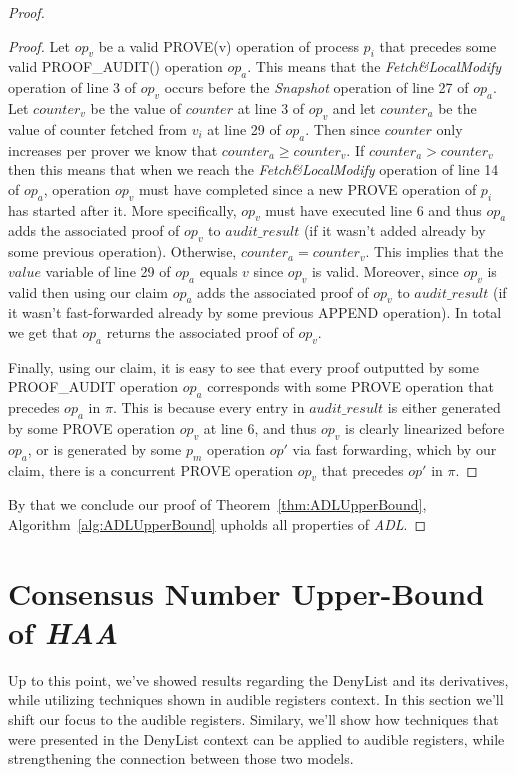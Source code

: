 \documentclass[11pt]{article}
\theoremstyle{definition}
\begin{document}
\begin{proof}
\begin{proof}
        Let $op_v$ be a valid PROVE(v) operation of process $p_i$ that precedes some valid PROOF\_AUDIT() operation $op_a$. This means that the \textit{Fetch\&LocalModify} operation of line 3 of $op_v$ occurs before the \textit{Snapshot} operation of line 27 of $op_a$. 
        Let $counter_v$ be the value of $counter$ at line 3 of $op_v$ and let $counter_a$ be the value of counter fetched from $v_i$ at line 29 of $op_a$. Then since $counter$ only increases per prover we know that $counter_a\geq counter_v$. If $counter_a > counter_v$ then this means that when we reach the \textit{Fetch\&LocalModify} operation of line 14 of $op_a$, operation $op_v$ must have completed since a new PROVE operation of $p_i$ has started after it. More specifically, $op_v$ must have executed line 6 and thus $op_a$ adds the associated proof of $op_v$ to $audit\_result$ (if it wasn't added already by some previous operation). Otherwise, $counter_a = counter_v$. This implies that the $value$ variable of line 29 of $op_a$ equals $v$ since $op_v$ is valid. Moreover, since $op_v$ is valid then using our claim $op_a$ adds the associated proof of $op_v$ to $audit\_result$ (if it wasn't fast-forwarded already by some previous APPEND operation). In total we get that $op_a$ returns the associated proof of $op_v$.

        Finally, using our claim, it is easy to see that every proof outputted by some PROOF\_AUDIT operation $op_a$ corresponds with some PROVE operation that precedes $op_a$ in $\pi$. This is because every entry in $audit\_result$ is either generated by some PROVE operation $op_v$ at line 6, and thus $op_v$ is clearly linearized before $op_a$, or is generated by some $p_m$ operation $op'$ via fast forwarding, which by our claim, there is a concurrent PROVE operation $op_v$ that precedes $op'$ in $\pi$.

    \end{proof}

    By that we conclude our proof of Theorem~\ref{thm:ADLUpperBound}, Algorithm~\ref{alg:ADLUpperBound} upholds all properties of \textit{ADL}.
\end{proof}


\section{Consensus Number Upper-Bound of \textit{HAA}}

Up to this point, we've showed results regarding the DenyList and its derivatives, while utilizing techniques shown in audible registers context. In this section we'll shift our focus to the audible registers. Similary, we'll show how techniques that were presented in the DenyList context can be applied to audible registers, while strengthening the connection between those two models.
\end{document}
